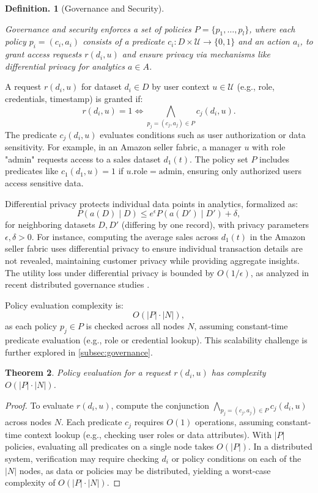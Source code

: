 \documentclass{amsart}
\newtheorem{thm}{Theorem}
\newtheorem{defn}[thm]{Definition.}
\begin{document}
\begin{defn}[Governance and Security]
\label{subsec:governance_security}


\emph{Governance and security} enforces a set of policies \( P = \{p_1, \dots, p_l\} \), where each policy \( p_i = (c_i, a_i) \) consists of a predicate \( c_i: D \times \mathcal{U} \to \{0, 1\} \) and an action \( a_i \), to grant access requests \( r(d_i, u) \) and ensure privacy via mechanisms like differential privacy for analytics \( a \in A \).
\end{defn}

A request \( r(d_i, u) \) for dataset \( d_i \in D \) by user context \( u \in \mathcal{U} \) (e.g., role, credentials, timestamp) is granted if:
\[
r(d_i, u) = 1 \iff \bigwedge_{p_j = (c_j, a_j) \in P} c_j(d_i, u).
\]
The predicate \( c_j(d_i, u) \) evaluates conditions such as user authorization or data sensitivity. For example, in an Amazon seller fabric, a manager \( u \) with role "admin" requests access to a sales dataset \( d_1(t) \). The policy set \( P \) includes predicates like \( c_1(d_1, u) = 1 \) if \( u.\text{role} = \text{admin} \), ensuring only authorized users access sensitive data.

Differential privacy protects individual data points in analytics, formalized as:
\[
P(a(D) \mid D) \leq e^\epsilon P(a(D') \mid D') + \delta,
\]
for neighboring datasets \( D, D' \) (differing by one record), with privacy parameters \( \epsilon, \delta > 0 \). For instance, computing the average sales across \( d_1(t) \) in the Amazon seller fabric uses differential privacy to ensure individual transaction details are not revealed, maintaining customer privacy while providing aggregate insights. The utility loss under differential privacy is bounded by \( O(1/\epsilon) \), as analyzed in recent distributed governance studies \cite{geeksforgeeks2025datagovernance}.

Policy evaluation complexity is:
\[
O(|P| \cdot |N|),
\]
as each policy \( p_j \in P \) is checked across all nodes \( N \), assuming constant-time predicate evaluation (e.g., role or credential lookup). This scalability challenge is further explored in \cref{subsec:governance}.

\begin{thm} \label{thm:policy_evaluation_complexity}
Policy evaluation for a request \( r(d_i, u) \) has complexity \( O(|P| \cdot |N|) \).
\end{thm}


\begin{proof}
To evaluate \( r(d_i, u) \), compute the conjunction \( \bigwedge_{p_j = (c_j, a_j) \in P} c_j(d_i, u) \) across nodes \( N \). Each predicate \( c_j \) requires \( O(1) \) operations, assuming constant-time context lookup (e.g., checking user roles or data attributes). With \( |P| \) policies, evaluating all predicates on a single node takes \( O(|P|) \). In a distributed system, verification may require checking \( d_i \) or policy conditions on each of the \( |N| \) nodes, as data or policies may be distributed, yielding a worst-case complexity of \( O(|P| \cdot |N|) \).
\end{proof}
\end{document}
